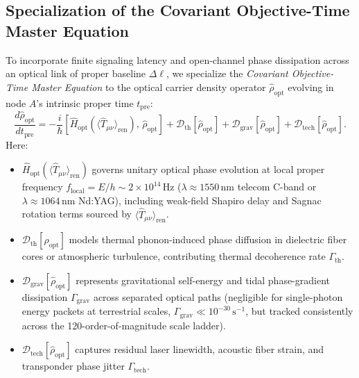 \documentclass[11pt,a4paper]{article}
\begin{document}
\subsection{Specialization of the Covariant Objective-Time Master Equation}

To incorporate finite signaling latency and open-channel phase dissipation across an optical link of proper baseline $\Delta\ell$, we specialize the \emph{Covariant Objective-Time Master Equation} \cite{damasio2026manifesto} to the optical carrier density operator $\hat{\rho}_{\mathrm{opt}}$ evolving in node $A$'s intrinsic proper time $t_{\mathrm{pre}}$:
\begin{equation}
\frac{d\hat{\rho}_{\mathrm{opt}}}{dt_{\mathrm{pre}}} = -\frac{i}{\hbar}\left[\hat{H}_{\mathrm{opt}}\!\left(\langle \hat{T}_{\mu\nu}\rangle_{\mathrm{ren}}\right),\, \hat{\rho}_{\mathrm{opt}}\right] + \mathcal{D}_{\mathrm{th}}[\hat{\rho}_{\mathrm{opt}}] + \mathcal{D}_{\mathrm{grav}}[\hat{\rho}_{\mathrm{opt}}] + \mathcal{D}_{\mathrm{tech}}[\hat{\rho}_{\mathrm{opt}}].
\label{eq:master_opt}
\end{equation}
Here:
\begin{itemize}[leftmargin=1.6em]
    \item $\hat{H}_{\mathrm{opt}}(\langle \hat{T}_{\mu\nu}\rangle_{\mathrm{ren}})$ governs unitary optical phase evolution at local proper frequency $f_{\mathrm{local}} = E/h \sim 2 \times 10^{14}\,\mathrm{Hz}$ ($\lambda \approx 1550\,\mathrm{nm}$ telecom C-band or $\lambda \approx 1064\,\mathrm{nm}$ Nd:YAG), including weak-field Shapiro delay and Sagnac rotation terms sourced by $\langle \hat{T}_{\mu\nu}\rangle_{\mathrm{ren}}$.
    \item $\mathcal{D}_{\mathrm{th}}[\hat{\rho}_{\mathrm{opt}}]$ models thermal phonon-induced phase diffusion in dielectric fiber cores or atmospheric turbulence, contributing thermal decoherence rate $\Gamma_{\mathrm{th}}$.
    \item $\mathcal{D}_{\mathrm{grav}}[\hat{\rho}_{\mathrm{opt}}]$ represents gravitational self-energy and tidal phase-gradient dissipation $\Gamma_{\mathrm{grav}}$ across separated optical paths (negligible for single-photon energy packets at terrestrial scales, $\Gamma_{\mathrm{grav}} \ll 10^{-30}\,\mathrm{s^{-1}}$, but tracked consistently across the 120-order-of-magnitude scale ladder).
    \item $\mathcal{D}_{\mathrm{tech}}[\hat{\rho}_{\mathrm{opt}}]$ captures residual laser linewidth, acoustic fiber strain, and transponder phase jitter $\Gamma_{\mathrm{tech}}$.
\end{itemize}
\end{document}
